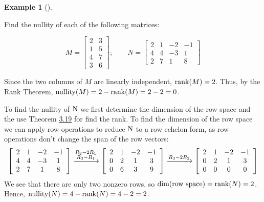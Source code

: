 \documentclass[
  a4paper,
  DIV=11,
  numbers=noendperiod,
  oneside]{scrreprt}
\theoremstyle{definition}
\newtheorem{example}{Example}[chapter]
\theoremstyle{remark}
\newenvironment{fbx}[3]{\begin{tcolorbox}[enhanced, breakable,%
attach boxed title to top*={xshift=1.4pt},
boxed title style={boxrule=0.0mm, fuzzy shadow={1pt}{-1pt}{0mm}{0.1mm}{gray}, arc=.3em, rounded corners=east, sharp corners=west}, colframe=#1-color2, colbacktitle=#1-color1, colback = white, coltitle=black,  titlerule=0mm, toprule=0pt, bottomrule=.7pt, leftrule=.3em, rightrule=0pt, outer arc=.3em,  arc=0pt,	 sharp corners = east, left=.5em, bottomtitle=1mm, toptitle=1mm,title=\textbf{#2}\hspace{0.5em}{#3}]}
{\end{tcolorbox}}
\begin{document}
\begin{example}[]\protect\hypertarget{exm-}{}\label{exm-}

Find the nullity of each of the following matrices:

\[M = \left[\begin{array}{cc} 2 & 3 \\ 1 & 5 \\ 4 & 7 \\ 3 & 6 \end{array}\right]; \qquad N = \left[\begin{array}{cccc} 2 & 1 & -2 & -1 \\ 4 & 4 & -3 & 1 \\ 2 & 7 & 1 & 8 \end{array}\right]\]

\begin{fbx}{Solution}{Solution}{}
\label{}
Since the two columns of \(M\) are linearly independent,
\({\rm rank}(M)=2\). Thus, by the Rank Theorem,
\({\rm nullity}(M) = 2 - {\rm rank}(M) = 2 - 2 = 0\).

To find the nullity of \({\rm N}\) we first determine the dimension of
the row space and the use Theorem \hyperref[rowcolumnspace]{3.19} for
find the rank. To find the dimension of the row space we can apply row
operations to reduce \({\rm N}\) to a row echelon form, as row
operations don't change the span of the row vectors:
\[\left[\begin{array}{cccc} 2 & 1 & -2 & -1 \\ 4 & 4 & -3 & 1 \\ 2 & 7 & 1 & 8 \end{array}\right] \xrightarrow{\begin{subarray}{c} R_2 - 2R_1 \\ R_3 - R_1 \end{subarray}} \left[\begin{array}{cccc} 2 & 1 & -2 & -1 \\ 0 & 2 & 1 & 3 \\ 0 & 6 & 3 & 9 \end{array}\right] \xrightarrow{R_3 - 2R_2} \left[\begin{array}{cccc} 2 & 1 & -2 & -1 \\ 0 & 2 & 1 & 3 \\ 0 & 0 & 0 & 0 \end{array}\right]\]
We see that there are only two nonzero rows, so
\({\rm dim(row\ space)} = {\rm rank}(N)=2\). Hence,
\({\rm nullity}(N) = 4 - {\rm rank}(N) = 4 - 2 = 2\).

\end{fbx}

\end{example}
\end{document}
